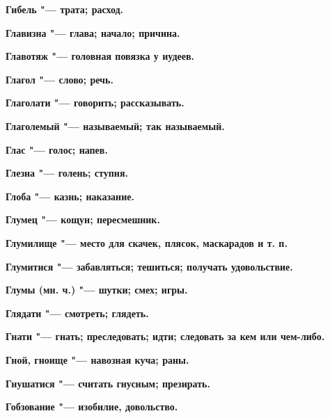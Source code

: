 \begin{multicols}{2}
\bfseries Гибель\normalfont{} "--- трата; расход. 




\bfseries Главизна\normalfont{} "--- глава; начало; причина. 




\bfseries Главотяж\normalfont{} "--- головная повязка у иудеев. 




\bfseries Глагол\normalfont{} "--- слово; речь. 




\bfseries Глаголати\normalfont{} "--- говорить; рассказывать. 




\bfseries Глаголемый\normalfont{} "--- называемый; так называемый. 




\bfseries Глас\normalfont{} "--- голос; напев. 




\bfseries Глезна\normalfont{} "--- голень; ступня. 




\bfseries Глоба\normalfont{} "--- казнь; наказание. 




\bfseries Глумец\normalfont{} "--- кощун; пересмешник. 




\bfseries Глумилище\normalfont{} "--- место для скачек, плясок, маскарадов и т. п. 




\bfseries Глумитися\normalfont{} "--- забавляться; тешиться; получать удовольствие. 




\bfseries Глумы\normalfont{} (мн. ч.) "--- шутки; смех; игры. 




\bfseries Глядати\normalfont{} "--- смотреть; глядеть. 




\bfseries Гнати\normalfont{} "--- гнать; преследовать; идти; следовать за кем или чем-либо. 




\bfseries Гной, гноище\normalfont{} "--- навозная куча; раны. 




\bfseries Гнушатися\normalfont{} "--- считать гнусным; презирать. 




\bfseries Гобзование\normalfont{} "--- изобилие, довольство. 





\end{multicols}
